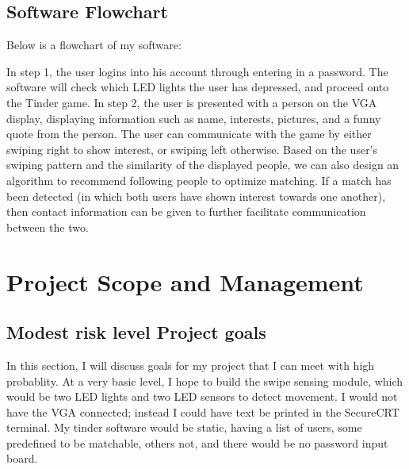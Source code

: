 \documentclass[12pt,twoside]{article}
\begin{document}
\subsection{Software Flowchart}
Below is a flowchart of my software: 
\begin{center} \end{center}
In step 1, the user logins into his account through entering in a password. The software will check which LED lights the user has depressed, and proceed onto the Tinder game. In step 2, the user is presented with a person on the VGA display, displaying information such as name, interests, pictures, and a funny quote from the person. The user can communicate with the game by either swiping right to show interest, or swiping left otherwise. Based on the user's swiping pattern and the similarity of the displayed people, we can also design an algorithm to recommend following people to optimize matching. If a match has been detected (in which both users have shown interest towards one another), then contact information can be given to further facilitate communication between the two. 

\section{Project Scope and Management}

\subsection{Modest risk level Project goals}
In this section, I will discuss goals for my project that I can meet with high probablity. At a very basic level, I hope to build the swipe sensing module, which would be two LED lights and two LED sensors to detect movement. I would not have the VGA connected; instead I could have text be printed in the SecureCRT terminal. My tinder software would be static, having a list of users, some predefined to be matchable, others not, and there would be no password input board.
\end{document}
